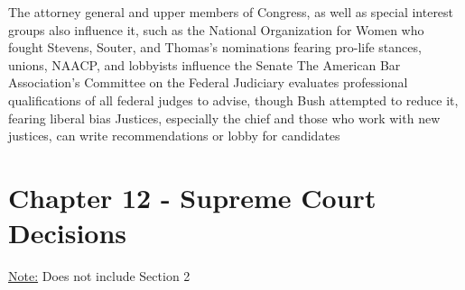\documentclass[11 pt, twoside]{article}
\newenvironment{outline*}
{
	\begin{outline}[enumerate]
	}
	{\end{outline}
}
\begin{document}
\begin{outline*}
\2 The attorney general and upper members of Congress, as well as special interest groups also influence it, such as the National Organization for Women who fought Stevens, Souter, and Thomas’s nominations fearing pro-life stances, unions, NAACP, and lobbyists influence the Senate
\2 The American Bar Association’s Committee on the Federal Judiciary evaluates professional qualifications of all federal judges to advise, though Bush attempted to reduce it, fearing liberal bias
\2 Justices, especially the chief and those who work with new justices, can write recommendations or lobby for candidates
\end{outline*}
\section{Chapter 12 - Supreme Court Decisions}
\underline{Note:} Does not include Section 2
\end{document}
